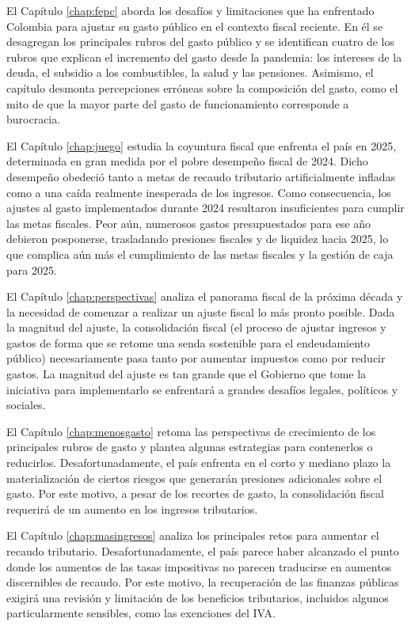 \begin{introduction}
El Capítulo \ref{chap:fepc} aborda los desafíos y limitaciones que ha enfrentado Colombia para ajustar su gasto público en el contexto fiscal reciente. En él se desagregan los principales rubros del gasto público y se identifican cuatro de los rubros que explican el incremento del gasto desde la pandemia: los intereses de la deuda, el subsidio a los combustibles, la salud y las pensiones. Asimismo, el capítulo desmonta percepciones erróneas sobre la composición del gasto, como el mito de que la mayor parte del gasto de funcionamiento corresponde a burocracia.

El Capítulo \ref{chap:juego} estudia la coyuntura fiscal que enfrenta el país en 2025, determinada en gran medida por el pobre desempeño fiscal de 2024. Dicho desempeño obedeció tanto a metas de recaudo tributario artificialmente infladas como a una caída realmente inesperada de los ingresos. Como consecuencia, los ajustes al gasto implementados durante 2024 resultaron insuficientes para cumplir las metas fiscales. Peor aún, numerosos gastos presupuestados para ese año debieron posponerse, trasladando presiones fiscales y de liquidez hacia 2025, lo que complica aún más el cumplimiento de las metas fiscales y la gestión de caja para 2025.

El Capítulo \ref{chap:perspectivas} analiza el panorama fiscal de la próxima década y la necesidad de comenzar a realizar un ajuste fiscal lo más pronto posible. Dada la magnitud del ajuste, la consolidación fiscal (el proceso de ajustar ingresos y gastos de forma que se retome una senda sostenible para el endeudamiento público) necesariamente pasa tanto por aumentar impuestos como por reducir gastos. La magnitud del ajuste es tan grande que el Gobierno que tome la iniciativa para implementarlo se enfrentará a grandes desafíos legales, políticos y sociales. 

El Capítulo \ref{chap:menosgasto} retoma las perspectivas de crecimiento de los principales rubros de gasto y plantea algunas estrategias para contenerlos o reducirlos. Desafortunadamente, el país enfrenta en el corto y mediano plazo la materialización de ciertos riesgos que generarán presiones adicionales sobre el gasto. Por este motivo, a pesar de los recortes de gasto, la consolidación fiscal requerirá de un aumento en los ingresos tributarios.

El Capítulo \ref{chap:masingresos} analiza los principales retos para aumentar el recaudo tributario. Desafortunadamente, el país parece haber alcanzado el punto donde los aumentos de las tasas impositivas no parecen traducirse en aumentos discernibles de recaudo. Por este motivo, la recuperación de las finanzas públicas exigirá una revisión y limitación de los beneficios tributarios, incluidos algunos particularmente sensibles, como las exenciones del IVA.


\end{introduction}
